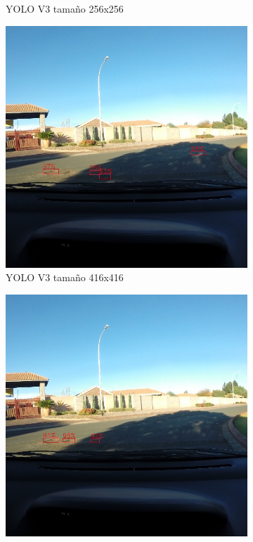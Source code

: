\begin{figure}[H]
\begin{subfigure}[h]{0.45\linewidth}
		\caption{YOLO V3 tamaño 256x256}
	\end{subfigure}
	\begin{subfigure}[h]{0.45\linewidth}
		\includegraphics[width=\linewidth]{images/results_a_yolo_v3_416.jpg}
		\caption{YOLO V3 tamaño 416x416}
	\end{subfigure}
	\begin{subfigure}[h]{0.45\linewidth}
		\includegraphics[width=\linewidth]{images/results_a_yolo_v3_640.jpg}

\end{subfigure}
\end{figure}
